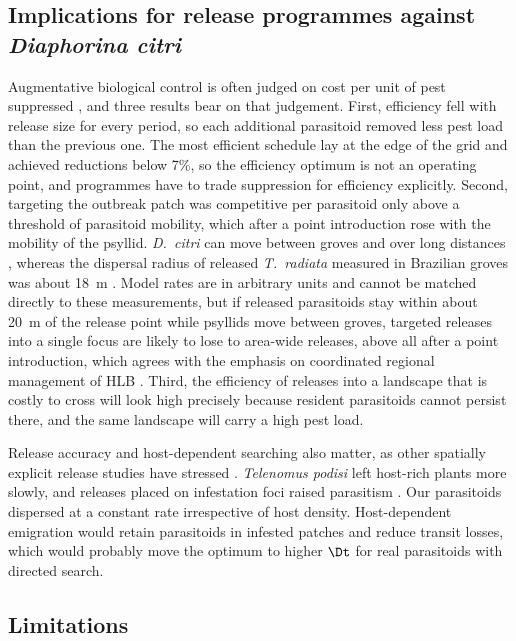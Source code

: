 \subsection*{Implications for release programmes against \emph{Diaphorina citri}}

Augmentative biological control is often judged on cost per unit of pest suppressed \citep{collier2004,vanlenteren2012}, and three results bear on that judgement. First, efficiency fell with release size for every period, so each additional parasitoid removed less pest load than the previous one. The most efficient schedule lay at the edge of the grid and achieved reductions below 7\%, so the efficiency optimum is not an operating point, and programmes have to trade suppression for efficiency explicitly. Second, targeting the outbreak patch was competitive per parasitoid only above a threshold of parasitoid mobility, which after a point introduction rose with the mobility of the psyllid. \emph{D.~citri} can move between groves and over long distances \citep{boina2009,lewisrosenblum2015}, whereas the dispersal radius of released \emph{T.~radiata} measured in Brazilian groves was about 18~m \citep{marin2023}. Model rates are in arbitrary units and cannot be matched directly to these measurements, but if released parasitoids stay within about 20~m of the release point while psyllids move between groves, targeted releases into a single focus are likely to lose to area-wide releases, above all after a point introduction, which agrees with the emphasis on coordinated regional management of HLB \citep{bassanezi2020}. Third, the efficiency of releases into a landscape that is costly to cross will look high precisely because resident parasitoids cannot persist there, and the same landscape will carry a high pest load.

Release accuracy and host-dependent searching also matter, as other spatially explicit release studies have stressed \citep{ARCASIM1996,Diatraea2024,SITMetapopulation2026}. \emph{Telenomus podisi} left host-rich plants more slowly, and releases placed on infestation foci raised parasitism \citep{PatchDispersal2026}. Our parasitoids dispersed at a constant rate irrespective of host density. Host-dependent emigration would retain parasitoids in infested patches and reduce transit losses, which would probably move the optimum to higher $\Dt$ for real parasitoids with directed search.

\subsection*{Limitations}

